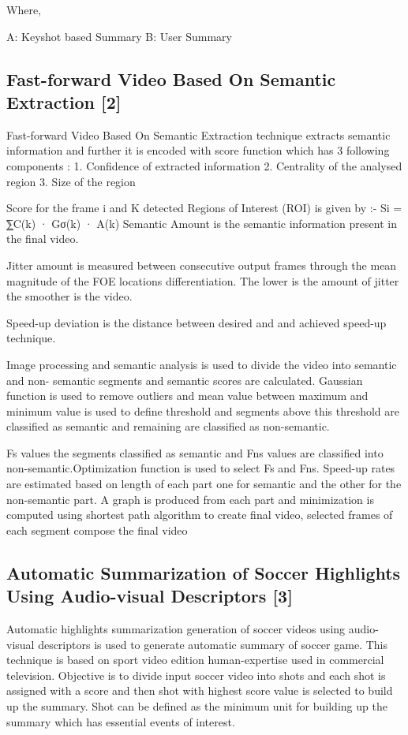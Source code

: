 \documentclass[twocolumn,showpacs,%
  nofootinbib,aps,superscriptaddress,%
  eqsecnum,prd,notitlepage,showkeys,10pt]{revtex4-1}
\begin{document}
Where,

A: Keyshot based Summary
B: User Summary


\subsection{Fast-forward Video Based On Semantic Extraction [2]
}
Fast-forward Video Based On Semantic Extraction technique extracts semantic information and further it is encoded with score function which has 3 following components :
1. Confidence of extracted information
2. Centrality of the analysed region
3. Size of the region

Score for the frame i and K detected Regions of Interest (ROI) is given by :- 
	Si =  ⅀C(k) · Gσ(k) · A(k)
Semantic Amount is the semantic information present in the final video.

Jitter amount  is measured between consecutive output frames through the mean magnitude of the FOE locations differentiation. The lower is the amount of jitter the smoother is the video.

Speed-up deviation is the distance between desired and and achieved speed-up technique.

Image processing and semantic analysis is used to divide the video into semantic and non- semantic segments and semantic scores are calculated. Gaussian function is used to remove outliers and mean value between maximum and minimum value is used to define threshold and segments above this threshold are classified as semantic and remaining are classified as non-semantic.

Fs values the segments classified as semantic and Fns values are classified into non-semantic.Optimization function is used to select Fs and Fns. Speed-up rates are estimated based on length of each part one for semantic and the other for the non-semantic part. A graph is produced from each part and minimization is computed using  shortest path algorithm to create final video, selected frames of each segment compose the final video

\subsection{Automatic Summarization of Soccer Highlights Using Audio-visual Descriptors [3]
}
Automatic highlights summarization generation of soccer videos  using audio-visual descriptors is used to generate automatic summary of soccer game. This technique is based on sport video edition human-expertise used in commercial television. Objective is to divide input soccer video into shots and each shot is assigned with a score and then shot with highest score value is selected to build up the summary. Shot can be defined as the minimum unit for building up the summary which has essential events of interest. 
\end{document}
